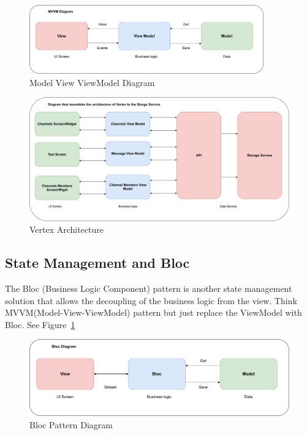 \begin{figure}[h!]
    \caption{Model View ViewModel Diagram}
    \label{image:mvvmDiagram}
    \centering
    \includegraphics[width=0.9\textwidth]{images/mvvm_diagram.png}
\end{figure}

\begin{figure}[h!]
    \caption{Vertex Architecture}
    \label{image:vertexArch}
    \centering
    \includegraphics[width=1.0\textwidth]{images/vertex_arch.png}
\end{figure}

\subsection{State Management and Bloc}
The Bloc (Business Logic Component) pattern is another state management solution that allows the decoupling of the business logic from the view. Think MVVM(Model-View-ViewModel) pattern but just replace the ViewModel with Bloc. 
See Figure~\ref{image:mvvmDiagram}

\begin{figure}[h!]
    \caption{Bloc Pattern Diagram}
    \label{image:blocPattern}
    \centering
    \includegraphics[width=1.0\textwidth]{images/Bloc_diagram.png}
\end{figure}

